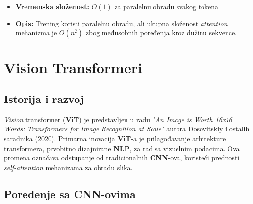 \documentclass[12pt]{article}
\begin{document}
   \begin{itemize}
      \item \textbf{Vremenska složenost:} \(O(1)\) za paralelnu obradu svakog tokena
      \item \textbf{Opis:} Trening koristi paralelnu obradu, ali ukupna složenost \textit{attention} 
      mehanizma je \(O(n^2)\) zbog međusobnih poređenja kroz dužinu sekvence.
   \end{itemize}

   \section{Vision Transformeri}
   \subsection{Istorija i razvoj}
   \textit{Vision} transformer (\textbf{ViT}) je predstavljen u radu 
   \textit{"An Image is Worth 16x16 Words: Transformers for Image Recognition at Scale"} \cite{vit} 
   autora Dosovitskiy i ostalih saradnika (2020). Primarna inovacija \textbf{ViT}-a je 
   prilagođavanje arhitekture transformera, prvobitno dizajnirane \textbf{NLP}, 
   za rad sa vizuelnim podacima. Ova promena označava odstupanje od 
   tradicionalnih \textbf{CNN}-ova, koristeći prednosti \textit{self-attention} mehanizama za obradu slika.

   \subsection{Poređenje sa CNN-ovima}
\end{document}
